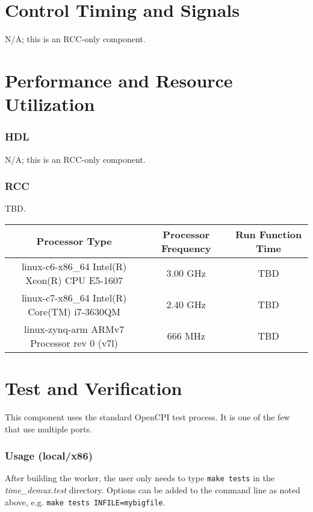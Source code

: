 \documentclass{article}
\begin{document}
\section*{Control Timing and Signals}
	N/A; this is an RCC-only component.

\section*{Performance and Resource Utilization}
	\subsubsection*{HDL}
	N/A; this is an RCC-only component.

	\subsubsection*{RCC}
	TBD.\\

	\begin{tabular}{|c|c|c|}
		\hline
		\rowcolor{blue}
		Processor Type & Processor Frequency & Run Function Time \\
		\hline
		linux-c6-x86\_64 Intel(R) Xeon(R) CPU E5-1607 & 3.00 GHz & TBD \\
		\hline
		linux-c7-x86\_64 Intel(R) Core(TM) i7-3630QM & 2.40 GHz & TBD \\
		\hline
		linux-zynq-arm ARMv7 Processor rev 0 (v7l) & 666 MHz & TBD \\
		\hline
	\end{tabular}

\normalsize
\section*{Test and Verification}

This component uses the standard OpenCPI test process. It is one of the few that use multiple ports. \textbf{}
\begin{center}
\end{center}

\iffalse
\subsubsection*{Usage (local/x86)}
After building the worker, the user only needs to type \verb+make tests+ in the \textit{time\_demux.test} directory. Options can be added to the command line as noted above, e.g. \verb+make tests INFILE=mybigfile+.
\end{document}
